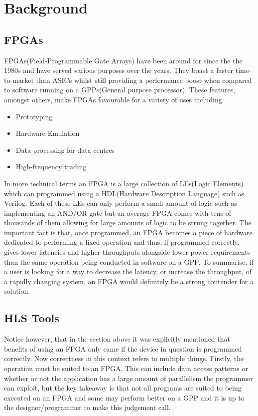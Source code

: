 \chapter{Background}

\section{FPGAs}
FPGAs(Field-Programmable Gate Arrays) have been around for since the the 1980s and have served various purposes over the years. They boast a faster time-to-market than ASICs whilst still providing a performance boost when compared to software running on a GPPs(General purpose processor). These features, amongst others, make FPGAs favourable for a variety of uses including:
\begin{itemize}
    \item Prototyping
    \item Hardware Emulation
    \item Data processing for data centres
    \item High-frequency trading
 \end{itemize}

In more technical terms an FPGA is a large collection of LEs(Logic Elements) which can programmed using a HDL(Hardware Description Language) such as Verilog. Each of these LEs can only perform a small amount of logic such as implementing an AND/OR gate but an average FPGA comes with tens of thousands of them allowing for large amounts of logic to be strung together. The important fact is that, once programmed, an FPGA becomes a piece of hardware dedicated to performing a fixed operation and thus, if programmed correctly, gives lower latencies and higher-throughputs alongside lower power requirements than the same operation being conducted in software on a GPP. To summarise, if a user is looking for a way to decrease the latency, or increase the throughput, of a rapidly changing system, an FPGA would definitely be a strong contender for a solution. 

\section{HLS Tools}
Notice however, that in the section above it was explicitly mentioned that benefits of using an FPGA only came if the device in question is programmed correctly. Now correctness in this context refers to multiple things. Firstly, the operation must be suited to an FPGA. This can include data access patterns or whether or not the application has a large amount of parallelism the programmer can exploit, but the key takeaway is that not all programs are suited to being executed on an FPGA and some may perform better on a GPP and it is up to the designer/programmer to make this judgement call.

